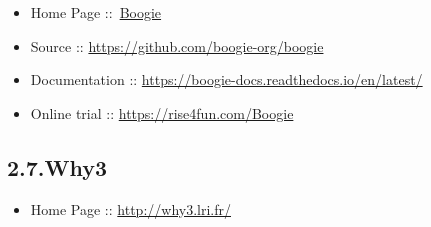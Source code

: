 \documentclass[12pt,twoside]{article}
\begin{document}
\begin{itemize}[noitemsep,topsep=\mdcompacttopsep]%

\item{}Home Page ::~\href{https://www.microsoft.com/en-us/research/project/boogie-an-intermediate-verification-language}{Boogie}%

\item{}Source :: \href{https://github.com/boogie-org/boogie}{{\ttfamily https://\hspace{0pt}github.\hspace{0pt}com/\hspace{0pt}boogie-\hspace{0pt}org/\hspace{0pt}boogie}}%

\item{}Documentation :: \href{https://boogie-docs.readthedocs.io/en/latest/}{{\ttfamily https://\hspace{0pt}boogie-\hspace{0pt}docs.\hspace{0pt}readthedocs.\hspace{0pt}io/\hspace{0pt}en/\hspace{0pt}latest/\hspace{0pt}}}%

\item{}Online trial :: \href{https://rise4fun.com/Boogie}{{\ttfamily https://\hspace{0pt}rise4fun.\hspace{0pt}com/\hspace{0pt}Boogie}}%
\end{itemize}%

\subsection{2.7.\hspace*{0.5em}Why3}\label{sec-why3}%

\begin{itemize}[noitemsep,topsep=\mdcompacttopsep]%

\item{}Home Page :: \href{http://why3.lri.fr/}{{\ttfamily http://\hspace{0pt}why3.\hspace{0pt}lri.\hspace{0pt}fr/\hspace{0pt}}}%
\end{itemize}%
\end{document}
